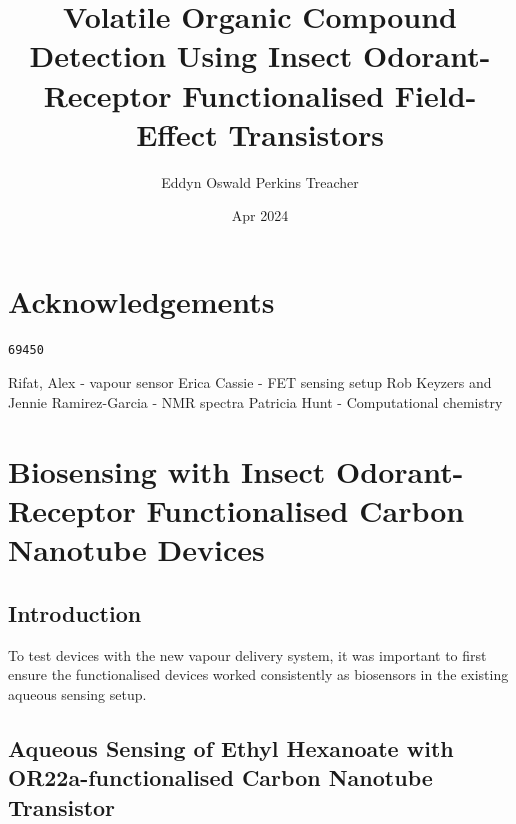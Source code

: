 \documentclass[
  a4paper,
]{scrbook}
\title{Volatile Organic Compound Detection Using Insect Odorant-Receptor
Functionalised Field-Effect Transistors}
\author{Eddyn Oswald Perkins Treacher}
\date{Apr 2024}
\renewcommand*\contentsname{Table of contents}
\newcommand\contentsname{Table of contents}
\begin{document}
\frontmatter
\maketitle
\ifdefined\Shaded\renewenvironment{Shaded}{\begin{tcolorbox}[frame hidden, interior hidden, boxrule=0pt, borderline west={3pt}{0pt}{shadecolor}, enhanced, breakable, sharp corners]}{\end{tcolorbox}}\fi

\renewcommand*\contentsname{Table of contents}
{
\setcounter{tocdepth}{2}
\tableofcontents
}
\mainmatter
{}

\hypertarget{acknowledgements}{%
\chapter*{Acknowledgements}\label{acknowledgements}}


\begin{verbatim}
69450
\end{verbatim}

Rifat, Alex - vapour sensor Erica Cassie - FET sensing setup Rob Keyzers
and Jennie Ramirez-Garcia - NMR spectra Patricia Hunt - Computational
chemistry


\hypertarget{biosensing-with-insect-odorant-receptor-functionalised-carbon-nanotube-devices}{%
\chapter{Biosensing with Insect Odorant-Receptor Functionalised Carbon
Nanotube
Devices}\label{biosensing-with-insect-odorant-receptor-functionalised-carbon-nanotube-devices}}

\hypertarget{introduction}{%
\section{Introduction}\label{introduction}}

To test devices with the new vapour delivery system, it was important to
first ensure the functionalised devices worked consistently as
biosensors in the existing aqueous sensing setup.

\hypertarget{sec-aqueous-sensing-EtHex}{%
\section{Aqueous Sensing of Ethyl Hexanoate with OR22a-functionalised
Carbon Nanotube Transistor}\label{sec-aqueous-sensing-EtHex}}
\end{document}
